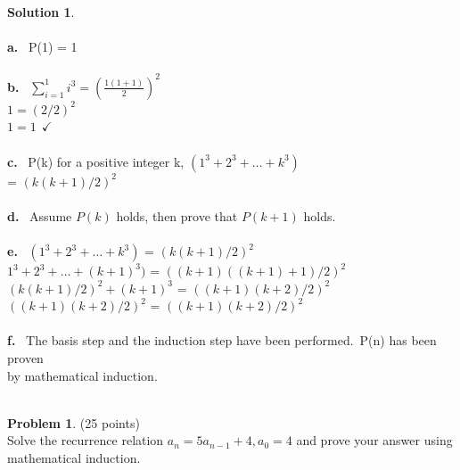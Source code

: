 \documentclass{article}
\theoremstyle{definition}
\newtheorem{problem}{Problem}
\newtheorem*{solution}{Solution}
\begin{document}
\begin{solution}\ \\
\ \\
\textbf{a.} \ P(1) = 1\ \\
\ \\
\textbf{b.} \ $\sum_{i=1}^1 i^3 = \left(\frac{1(1+1)}{2}\right)^2$\ \\
$1 = (2/2)^2$\ \\
$1 = 1 \ \ \checkmark$\ \\
\ \\
\textbf{c.} \ P(k) for a positive integer k, $(1^3+ 2^3+\dots+k
^3)$\ \\ 
= $(k(k+ 1)/2)^2$\ \\
\ \\
\textbf{d.} \ Assume $P(k)$ holds, then prove that $P(k+1)$ holds.\ \\
\ \\
\textbf{e.} \ $(1^3+ 2^3+\dots+k^3)$ = $(k(k+ 1)/2)^2$\ \\
$1^3+ 2^3+\dots+(k+1)^3)$ = $((k+1)((k+1) + 1)/2)^2$\ \ \ \ \\
$ (k(k + 1)/2)^2 + (k + 1)^3$ =  $((k + 1)(k + 2)/2)^2$\ \\
$((k + 1)(k + 2)/2)^2$  = $((k + 1)(k + 2)/2)^2$ \ \ \checkmark\ \\
\ \\
\textbf{f.} \ The basis step and the induction step have been performed.\ P(n) has been proven \\ \indent by mathematical induction.\ \\ 
\ \\
\end{solution}
\newpage

\begin{problem} (25 points)\\
Solve the recurrence relation $a_n = 5a_{n-1}+4, a_0 = 4$ and prove your answer using mathematical induction.
\end{problem}
\end{document}
